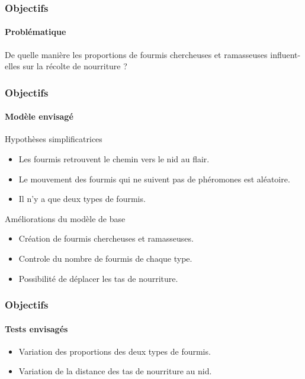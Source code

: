 \documentclass[11pt]{beamer}
\begin{document}
\begin{frame}
\frametitle{Objectifs}
\framesubtitle{Problématique}
\begin{center} De quelle manière les proportions de fourmis chercheuses et ramasseuses influent-elles sur la récolte de nourriture ?
\end{center}
\end{frame}

\begin{frame}
\frametitle{Objectifs}
\framesubtitle{Modèle envisagé}
\begin{block}{Hypothèses simplificatrices}
\begin{itemize}
\item Les fourmis retrouvent le chemin vers le nid au flair.
\item Le mouvement des fourmis qui ne suivent pas de phéromones est aléatoire.
\item Il n'y a que deux types de fourmis.
\end{itemize}
\end{block}
\begin{block}{Améliorations du modèle de base}
\begin{itemize}
\item Création de fourmis chercheuses et ramasseuses.
\item Controle du nombre de fourmis de chaque type.
\item Possibilité de déplacer les tas de nourriture.
\end{itemize}
\end{block}
\end{frame}

\begin{frame}
\frametitle{Objectifs}
\framesubtitle {Tests envisagés}
\begin{itemize}
\item Variation des proportions des deux types de fourmis.
\item Variation de la distance des tas de nourriture au nid.
\end{itemize}
\end{frame}
\end{document}
